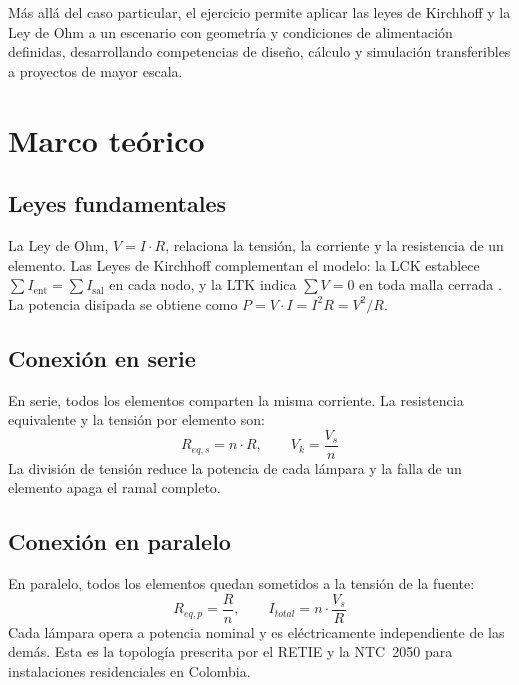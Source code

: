 Más allá del caso particular, el ejercicio permite aplicar las leyes de Kirchhoff y la Ley de Ohm a un escenario con geometría y condiciones de alimentación definidas, desarrollando competencias de diseño, cálculo y simulación transferibles a proyectos de mayor escala.

\section{Marco teórico}

\subsection{Leyes fundamentales}

La Ley de Ohm, $V = I \cdot R$, relaciona la tensión, la corriente y la resistencia de un elemento. Las Leyes de Kirchhoff complementan el modelo: la LCK establece $\sum I_{\text{ent}} = \sum I_{\text{sal}}$ en cada nodo, y la LTK indica $\sum V = 0$ en toda malla cerrada \cite{nilsson2015}. La potencia disipada se obtiene como $P = V \cdot I = I^2 R = V^2 / R$.

\subsection{Conexión en serie}

En serie, todos los elementos comparten la misma corriente. La resistencia equivalente y la tensión por elemento son:
\begin{equation}
  R_{eq,s} = n \cdot R, \qquad V_k = \frac{V_s}{n}
  \label{eq:serie}
\end{equation}
La división de tensión reduce la potencia de cada lámpara y la falla de un elemento apaga el ramal completo.

\subsection{Conexión en paralelo}

En paralelo, todos los elementos quedan sometidos a la tensión de la fuente:
\begin{equation}
  R_{eq,p} = \frac{R}{n}, \qquad I_{total} = n \cdot \frac{V_s}{R}
  \label{eq:paralelo}
\end{equation}
Cada lámpara opera a potencia nominal y es eléctricamente independiente de las demás. Esta es la topología prescrita por el RETIE \cite{retie2013} y la NTC~2050 \cite{ntc2050} para instalaciones residenciales en Colombia.

